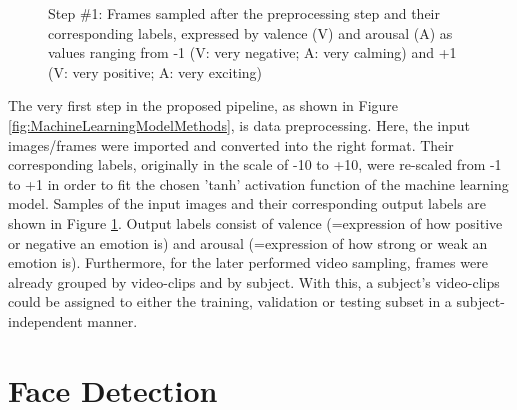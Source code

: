 \begin{figure}[H]
  \hfill
  \caption[ER pipeline step \#1: Preprocessing]{Step \#1: Frames sampled after the preprocessing step and their corresponding labels, expressed by valence (V) and arousal (A) as values ranging from -1 (V: very negative; A: very calming) and +1 (V: very positive; A: very exciting)}
  \label{fig:MethodologyPreprocess}
\end{figure}

The very first step in the proposed pipeline, as shown in Figure \ref{fig:MachineLearningModelMethods}, is data preprocessing. Here, the input images/frames were imported and converted into the right format. Their corresponding labels, originally in the scale of -10 to +10, were re-scaled from -1 to +1 in order to fit the chosen 'tanh' activation function of the machine learning model.
\newline\newline
Samples of the input images and their corresponding output labels are shown in Figure \ref{fig:MethodologyPreprocess}. Output labels consist of valence (=expression of how positive or negative an emotion is) and arousal (=expression of how strong or weak an emotion is).
\newline\newline
Furthermore, for the later performed video sampling, frames were already grouped by video-clips and by subject. With this, a subject's video-clips could be assigned to either the training, validation or testing subset in a subject-independent manner. 

\section{Face Detection} \label{sec:FaceDetection}

